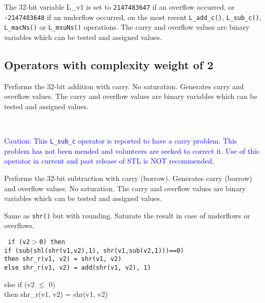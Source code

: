 The 32-bit variable L\_v1 is set to {\tt 2147483647} if an overflow occurred, or {\tt -2147483648} if an underflow occurred, on the most recent {\tt L\_add\_c()}, {\tt L\_sub\_c()}, {\tt L\_macNs()} or {\tt L\_msuNs()} operations.
The carry and overflow values are binary variables which can be tested and assigned values.


\subsection{Operators with complexity weight of 2}


Performs the 32-bit addition with carry.
No saturation.
Generates carry and overflow values.
The carry and overflow values are binary variables which can be tested and assigned values.

\ \\

\textcolor{blue}{
%
  Caution: This {\tt L\_sub\_c} operator is reported to have a carry problem.
  This problem has not been mended and volunteers are seeked to correct it.
  Use of this operator in current and past release of STL is NOT recommended.
%
}

Performs the 32-bit subtraction with carry (borrow).
Generates carry (borrow) and overflow values.
No saturation.
The carry and overflow values are binary variables which can be tested and assigned values.


Same as {\tt shr()} but with rounding.
Saturate the result in case of underflows or overflows.

{\tt
{} if (v2$>$0) then\\
 if (sub(shl(shr(v1,v2),1), shr(v1,sub(v2,1)))==0) \\
 then shr\_r(v1, v2) = shr(v1, v2)\\
 else shr\_r(v1, v2) = add(shr(v1, v2), 1)

 else if (v2 $\leq$ 0) \\
 then shr\_r(v1, v2) = shr(v1, v2)}


